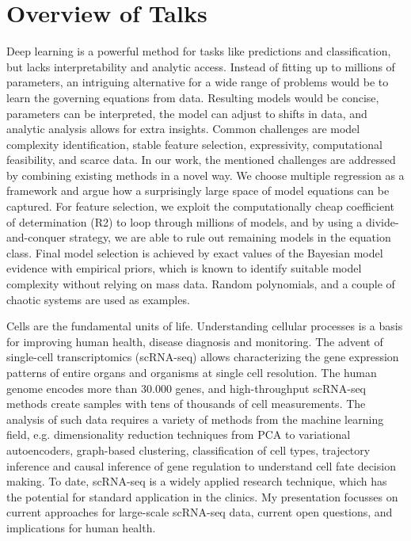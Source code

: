 \section{Overview of Talks}


\license

Deep learning is a powerful method for tasks like predictions and classification, but lacks interpretability and analytic access. Instead of fitting up to millions of parameters, an intriguing alternative for a wide range of problems would be to learn the governing equations from data. Resulting models would be concise, parameters can be interpreted, the model can adjust to shifts in data, and analytic analysis allows for extra insights. Common challenges are model complexity identification, stable feature selection, expressivity, computational feasibility, and scarce data. In our work, the mentioned challenges are addressed by combining existing methods in a novel way. We choose multiple regression as a framework and argue how a surprisingly large space of model equations can be captured. For feature selection, we exploit the computationally cheap coefficient of determination (R2) to loop through millions of models, and by using a divide-and-conquer strategy, we are able to rule out remaining models in the equation class. Final model selection is achieved by exact values of the Bayesian model evidence with empirical priors, which is known to identify suitable model complexity without relying on mass data. Random polynomials, and a couple of chaotic systems are used as examples.
 

\license

Cells are the fundamental units of life. Understanding cellular processes is a basis for improving human health, disease diagnosis and monitoring. The advent of single-cell transcriptomics (scRNA-seq) allows characterizing the gene expression patterns of entire organs and organisms at single cell resolution. The human genome encodes more than 30.000 genes, and high-throughput scRNA-seq methods create samples with tens of thousands of cell measurements. The analysis of such data requires a variety of methods from the machine learning field, e.g. dimensionality reduction techniques from PCA to variational autoencoders, graph-based clustering, classification of cell types, trajectory inference and causal inference of gene regulation to understand cell fate decision making. To date, scRNA-seq is a widely applied research technique, which has the potential for standard application in the clinics.  My presentation focusses on current approaches for large-scale scRNA-seq data, current open questions, and implications for human health.

